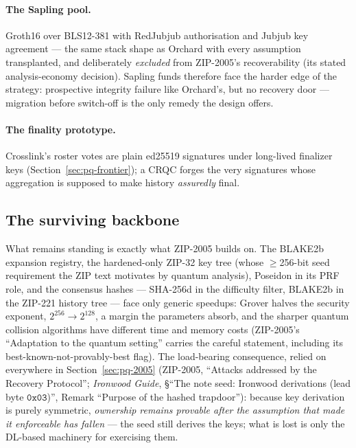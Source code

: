 \documentclass[11pt,a4paper]{article}
\theoremstyle{definition}
\begin{document}
\paragraph{The Sapling pool.} Groth16 over BLS12-381 with RedJubjub
authorisation and Jubjub key agreement --- the same stack shape as
Orchard with every assumption transplanted, and deliberately
\emph{excluded} from ZIP-2005's recoverability (its stated
analysis-economy decision). Sapling funds therefore face the harder
edge of the strategy: prospective integrity failure like Orchard's,
but no recovery door --- migration before switch-off is the only
remedy the design offers.

\paragraph{The finality prototype.} Crosslink's roster votes are plain
ed25519 signatures under long-lived finalizer keys
(Section~\ref{sec:pq-frontier}); a CRQC forges the very signatures
whose aggregation is supposed to make history \emph{assuredly} final.

\subsection{The surviving backbone}\label{sec:pq-backbone}

What remains standing is exactly what ZIP-2005 builds on. The BLAKE2b
expansion registry, the hardened-only ZIP-32 key tree (whose
$\geq$256-bit seed requirement the ZIP text motivates by quantum
analysis), Poseidon in its PRF role, and the consensus hashes ---
SHA-256d in the difficulty filter, BLAKE2b in the ZIP-221 history tree
--- face only generic speedups: Grover halves the security exponent,
$2^{256} \to 2^{128}$, a margin the parameters absorb, and the sharper
quantum collision algorithms have different time and memory costs
(ZIP-2005's ``Adaptation to the quantum setting'' carries the careful
statement, including its best-known-not-provably-best flag). The
load-bearing consequence, relied on everywhere in
Section~\ref{sec:pq-2005} (ZIP-2005, ``Attacks addressed by the Recovery
Protocol''; \emph{Ironwood Guide}, \S``The note seed: Ironwood derivations
(lead byte $\mathtt{0x03}$)'', Remark ``Purpose of the hashed trapdoor''):
because key derivation is purely symmetric, \emph{ownership remains
provable after the assumption that made it enforceable has fallen} ---
the seed still derives the keys; what is lost is only the DL-based
machinery for exercising them.
\end{document}
